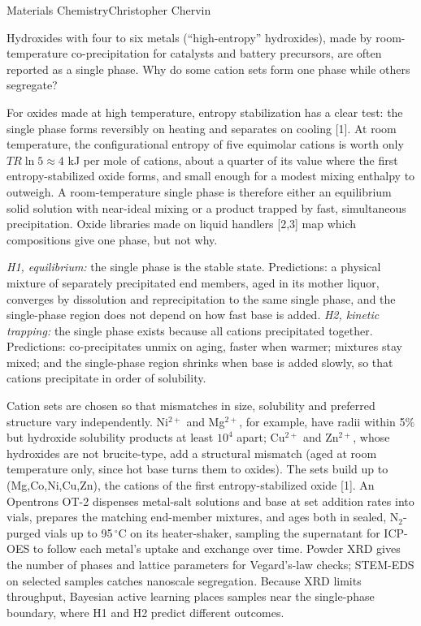 \documentclass[11pt,letterpaper]{article}
\begin{document}
  {Materials Chemistry}{Christopher Chervin}

 Hydroxides with four to six metals (``high-entropy'' hydroxides), made by
room-temperature co-precipitation for catalysts and battery precursors, are often reported as a
single phase. Why do some cation sets form one phase while others segregate?

 For oxides made at high temperature, entropy stabilization has a clear test: the
single phase forms reversibly on heating and separates on cooling [1]. At room temperature, the
configurational entropy of five equimolar cations is worth only $TR\ln 5 \approx 4$ kJ per mole of
cations, about a quarter of its value where the first entropy-stabilized oxide forms, and small
enough for a modest mixing enthalpy to outweigh. A room-temperature single phase is therefore either
an equilibrium solid solution with near-ideal mixing or a product trapped by fast, simultaneous
precipitation. Oxide libraries made on liquid handlers [2,3] map which compositions give one phase,
but not why.

 \emph{H1, equilibrium:} the single phase is the stable state. Predictions: a
physical mixture of separately precipitated end members, aged in its mother liquor, converges by
dissolution and reprecipitation to the same single phase, and the single-phase region does not
depend on how fast base is added. \emph{H2, kinetic trapping:} the single phase exists because all
cations precipitated together. Predictions: co-precipitates unmix on aging, faster when warmer;
mixtures stay mixed; and the single-phase region shrinks when base is added slowly, so that cations
precipitate in order of solubility.

 Cation sets are chosen so that mismatches in size, solubility and preferred
structure vary independently. Ni$^{2+}$ and Mg$^{2+}$, for example, have radii within 5\% but
hydroxide solubility products at least $10^4$ apart; Cu$^{2+}$ and Zn$^{2+}$, whose hydroxides are not
brucite-type, add a structural mismatch (aged at room temperature only, since hot base turns them
to oxides). The sets build up to (Mg,Co,Ni,Cu,Zn), the cations of the
first entropy-stabilized oxide [1]. An Opentrons OT-2 dispenses metal-salt solutions and base at set
addition rates into vials, prepares the matching end-member mixtures, and ages both in sealed,
N$_2$-purged vials up to 95\,$^\circ$C on its heater-shaker, sampling the supernatant for ICP-OES to
follow each metal's uptake and exchange over time. Powder XRD gives the number of phases and
lattice parameters for Vegard's-law checks; STEM-EDS on selected samples catches nanoscale
segregation. Because XRD limits throughput, Bayesian active learning
places samples near the single-phase boundary, where H1 and H2 predict different outcomes.
\end{document}
